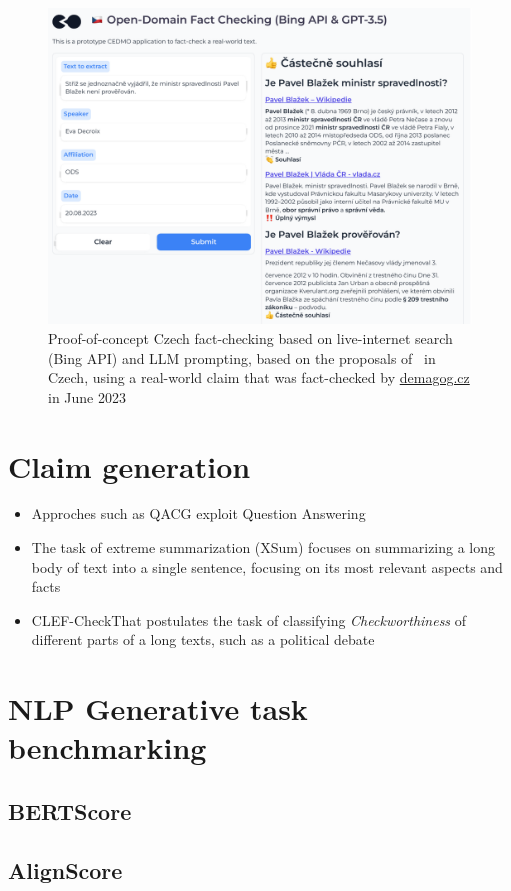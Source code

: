 \begin{figure}
    \includegraphics[width=14cm]{fig/bing.pdf}
    \caption{Proof-of-concept Czech fact-checking based on live-internet search (Bing API) and LLM prompting, based on the proposals of~\cite{bing} in Czech, using a real-world claim that was fact-checked by \href{https://demagog.cz/vyrok/22849}{\url{demagog.cz}} in June 2023}
    \label{fig:bing}
\end{figure}


\section{Claim generation}
\begin{itemize}
    \item Approches such as QACG exploit Question Answering
    \item The task of extreme summarization (XSum) focuses on summarizing a long body of text into a single sentence, focusing on its most relevant aspects and facts
    \item CLEF-CheckThat postulates the task of classifying \textit{Checkworthiness} of different parts of a long texts, such as a political debate
\end{itemize}

\section{NLP Generative task benchmarking}
\subsection{BERTScore}
\subsection{AlignScore}